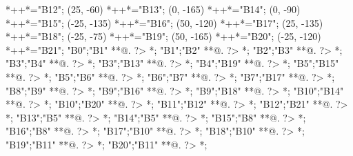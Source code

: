 \begin{scriptsize}
	*++{}*\frm{-,}="B12";
(25, -60)
	*++{}*\frm{-,}="B13";
(0, -165)
	*++{}*\frm{-,}="B14";
(0, -90)
	*++{}*\frm{-,}="B15";
(-25, -135)
	*++{}*\frm{-,}="B16";
(50, -120)
	*++{}*\frm{-,}="B17";
(25, -135)
	*++{}*\frm{-,}="B18";
(-25, -75)
	*++{}*\frm{-,}="B19";
(50, -165)
	*++{}*\frm{-,}="B20";
(-25, -120)
	*++{}*\frm{-,}="B21";
"B0";"B1" **@{.} ?> *{\dir{>}};
"B1";"B2" **@{.} ?> *{\dir{>}};
"B2";"B3" **@{.} ?> *{\dir{>}};
"B3";"B4" **@{.} ?> *{\dir{>}};
"B3";"B13" **@{.} ?> *{\dir{>}};
"B4";"B19" **@{.} ?> *{\dir{>}};
"B5";"B15" **@{.} ?> *{\dir{>}};
"B5";"B6" **@{.} ?> *{\dir{>}};
"B6";"B7" **@{.} ?> *{\dir{>}};
"B7";"B17" **@{.} ?> *{\dir{>}};
"B8";"B9" **@{.} ?> *{\dir{>}};
"B9";"B16" **@{.} ?> *{\dir{>}};
"B9";"B18" **@{.} ?> *{\dir{>}};
"B10";"B14" **@{.} ?> *{\dir{>}};
"B10";"B20" **@{.} ?> *{\dir{>}};
"B11";"B12" **@{.} ?> *{\dir{>}};
"B12";"B21" **@{.} ?> *{\dir{>}};
"B13";"B5" **@{.} ?> *{\dir{>}};
"B14";"B5" **@{.} ?> *{\dir{>}};
"B15";"B8" **@{.} ?> *{\dir{>}};
"B16";"B8" **@{.} ?> *{\dir{>}};
"B17";"B10" **@{.} ?> *{\dir{>}};
"B18";"B10" **@{.} ?> *{\dir{>}};
"B19";"B11" **@{.} ?> *{\dir{>}};
"B20";"B11" **@{.} ?> *{\dir{>}};
\endxy
\end{scriptsize}


